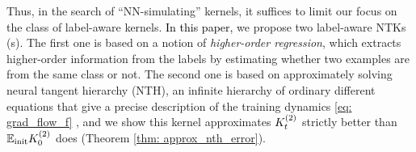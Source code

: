 Thus, in the search of ``NN-simulating'' kernels, it suffices to limit our focus on the class of label-aware kernels. 
\textcolor{black}{In this paper,} we propose two label-aware NTKs (\lantk s). 
The first one is based on a notion of \emph{higher-order regression}, which extracts higher-order information from the labels by estimating whether two examples are from the same class or not. The second one is based on approximately solving neural tangent hierarchy (NTH), an infinite hierarchy of ordinary different equations that give a precise description of the training dynamics \eqref{eq: grad_flow_f} \citep{huang2019dynamics}, and we show this kernel approximates ${K}^{(2)}_t$ strictly better than ${\mathbb{E}}_{\textnormal{init}} {K}^{(2)}_0$ does (Theorem \ref{thm: approx_nth_error}). 

